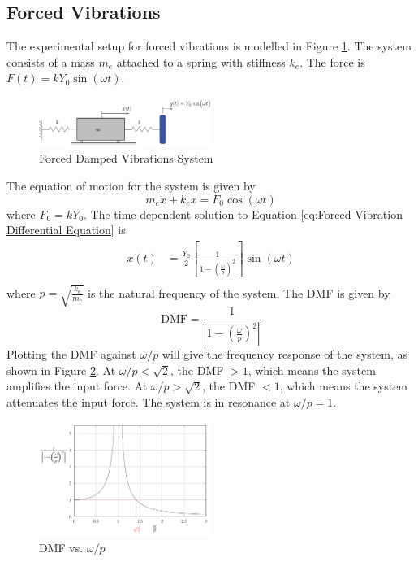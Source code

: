 \subsection{Forced Vibrations}
The experimental setup for forced vibrations is modelled in Figure \ref{fig:Forced Vibrations System Theoretical}. The system consists of a mass $m_e$ attached to a spring with stiffness $k_e$. The force is $F(t) = kY_0\sin(\omega t)$.
\begin{figure}[H]
    \centering
    \includegraphics[width=0.5\textwidth]{Sections/Figures/theory forced spring mass.png}
    \caption{Forced Damped Vibrations System}
    \label{fig:Forced Vibrations System Theoretical}
\end{figure}
The equation of motion for the system is given by
\begin{equation}
    m_e\ddot{x} + k_ex = F_0\cos(\omega t) \label{eq:Forced Vibration Differential Equation}
\end{equation}
where $F_0 = kY_0$. The time-dependent solution to Equation \ref{eq:Forced Vibration Differential Equation} is 
\begin{align}
    x(t) &= \frac{Y_0}{2} \left[\frac{1}{1 - \left(\frac{\omega}{p}\right)^2}\right]\sin(\omega t) \label{eq:Forced Vibration Solution} \\
\end{align}
where $p = \sqrt{\frac{k_e}{m_e}}$ is the natural frequency of the system. The DMF is given by
\begin{equation}
    \text{DMF} = \frac{1}{\left|1 - \left(\frac{\omega}{p}\right)^2\right|} \label{eq:DMF}
\end{equation}
Plotting the DMF against $\omega/p$ will give the frequency response of the system, as shown in Figure \ref{fig:DMF}. At $\omega/p< \sqrt{2}$, the DMF $>1$, which means the system amplifies the input force. At $\omega/p > \sqrt{2}$, the DMF $<1$, which means the system attenuates the input force. The system is in resonance at $\omega/p = 1$.
\begin{figure}[h]
    \centering
    \includegraphics[width=0.5\textwidth]{Sections/Figures/DMF.png}
    \caption{DMF vs. $\omega/p$}
    \label{fig:DMF}
\end{figure}

